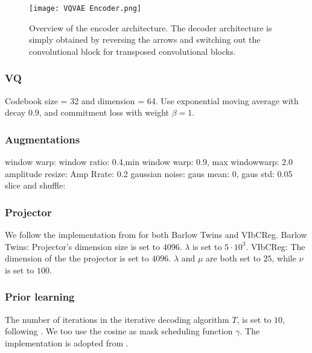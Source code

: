 \documentclass[../../thesis.tex]{subfiles}
\begin{document}
\begin{figure}[h]
    
    \texttt{[image: VQVAE Encoder.png]}
    \centering
    \caption{Overview of the encoder architecture. The decoder architecture is simply obtained by reversing the arrows and switching out the convolutional block for transposed convolutional blocks.}
    \label{fig:VQVAE Encoder}
\end{figure}

\subsubsection{VQ}
Codebook size = 32 and dimension = 64. \newline
Use exponential moving average with decay $0.9$, and commitment loss with weight $\beta = 1$.

\subsubsection{Augmentations}
window warp:    window ratio: 0.4,min window warp: 0.9, max windowwarp: 2.0\newline
amplitude resize: Amp Rrate: 0.2\newline
gaussian noise: gaus mean: 0, gaus std: 0.05\newline
slice and shuffle:\newline

\subsubsection{Projector}
We follow the implementation from \cite{lee2024computer} for both Barlow Twins and VIbCReg.\newline
Barlow Twins: Projector's dimension size is set to $4096$. $\lambda$ is set to $5\cdot10^3$. \newline
VIbCReg: The dimension of the the projector is set to $4096$. $\lambda$ and $\mu$ are both set to $25$, while $\nu$ is set to $100$.

\subsubsection{Prior learning}
The number of iterations in the iterative decoding algorithm $T$, is set to $10$, following \cite{chang2022maskgit}. We too use the cosine as mask scheduling function $\gamma$. The implementation is adopted from \cite{TimeVQVAE}. 
\end{document}
